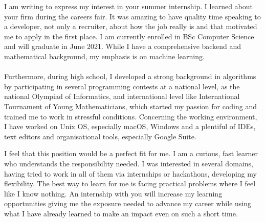 \documentclass[12pt, a4paper]{awesome-cv}
\begin{document}
\makecvheader

\makelettertitle

\begin{cvletter}
I am writing to express my interest in your summer internship. I learned about your firm during the careers fair. It was amazing to have quality time speaking to a developer, not only a recruiter, about how the job really is and that motivated me to apply in the first place.
I am currently enrolled in BSc Computer Science and will graduate in June 2021. While I have a comprehensive backend and mathematical background, my emphasis is on machine learning. \\ \\
Furthermore, during high school, I developed a strong background in algorithms by participating in several programming contests at a national level, as the national Olympiad of Informatics, and international level like International Tournament of Young Mathematicians, which started my passion for coding and trained me to work in stressful conditions. Concerning the working environment, I have worked on Unix OS, especially macOS, Windows and a plentiful of IDEs, text editors and organisational tools, especially Google Suite.


I feel that this position would be a perfect fit for me. I am a curious, fast learner who understands the responsibility needed. I was interested in several domains, having tried to work in all of them via internships or hackathons, developing my flexibility. The best way to learn for me is facing practical problems where I feel like I know nothing. An internship with you will increase my learning opportunities giving me the exposure needed to advance my career while using what I have already learned to make an impact even on such a short time.



\end{cvletter}
\end{document}
